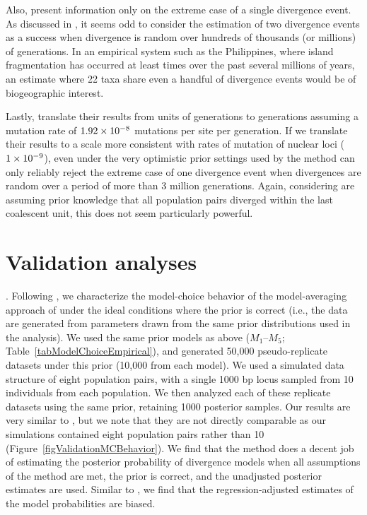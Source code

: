\documentclass[letterpaper,12pt]{article}
\begin{document}
\begin{linenumbers}
Also, \citet{Hickerson2013} present information only on the extreme case of a
single divergence event.
As discussed in \citet{Oaks2012}, it seems odd to consider the estimation
of two divergence events as a success when divergence is random over hundreds
of thousands (or millions) of generations.
In an empirical system such as the Philippines, where island fragmentation has
occurred at least  times over the past several millions of years,
an estimate where 22 taxa share even a handful of divergence events would be of
biogeographic interest.

Lastly, \citet{Hickerson2013} translate their results from units of
\globalcoalunit generations to generations assuming a mutation rate of
$1.92\times 10^{-8}$ mutations per site per generation.
If we translate their results to a scale more consistent with rates of mutation
of nuclear loci ($1\times 10^{-9}$), even under the very optimistic prior settings used
by \citet{Hickerson2013} the method can only reliably reject the extreme case
of one divergence event when divergences are random over a period of more than
3 million generations.
Again, considering \citet{Hickerson2013} are assuming prior knowledge that
all population pairs diverged within the last coalescent unit, this
does not seem particularly powerful.

\section*{Validation analyses}
.
Following \citet{Oaks2012}, we characterize the model-choice behavior of the
model-averaging approach of \citet{Hickerson2013} under the ideal conditions
where the prior is correct (i.e., the data are generated from parameters drawn
from the same prior distributions used in the analysis).
We used the same prior models as above ($M_1$--$M_5$;
Table~\ref{tabModelChoiceEmpirical}), and generated 50,000 pseudo-replicate
datasets under this prior (10,000 from each model).
We used a simulated data structure of eight population pairs, with a single
1000 bp locus sampled from 10 individuals from each population.
We then analyzed each of these replicate datasets using the same prior,
retaining 1000 posterior samples.
Our results are very similar to \citet{Oaks2012}, but we note that they
are not directly comparable as our simulations contained eight population
pairs rather than 10 (Figure~\ref{figValidationMCBehavior}).
We find that the method does a decent job of estimating the posterior
probability of divergence models when all assumptions of the method
are met, the prior is correct, and the unadjusted posterior estimates
are used.
Similar to \cite{Oaks2012}, we find that the regression-adjusted estimates of
the model probabilities are biased.





\end{linenumbers}
\end{document}
